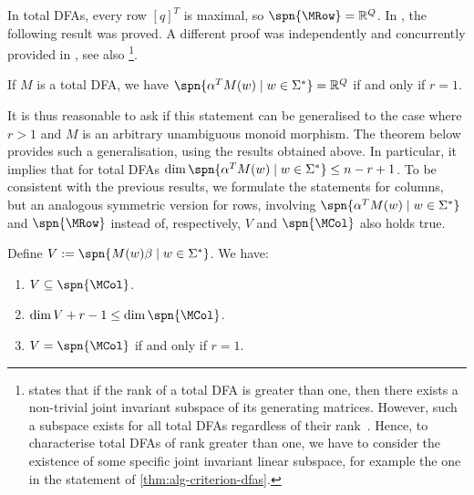 In total DFAs, every row $[q]^T$ is maximal, so $\spn{\MRow} = \mathbb{R}^Q$. In \cite[Criterion~1]{DBLP:journals/isci/BerlinkovS16}, the following result was proved. A different proof was independently and concurrently provided in \cite[\S8]{Voynov2015Compact}, see also \cite{Protasov2021}\footnote{ \cite[Theorem 2]{Protasov2021} states that if the rank of a total DFA is greater than one, then there exists a non-trivial joint invariant subspace of its generating matrices. However, such a subspace exists for all total DFAs regardless of their rank~\cite[Corollary 4]{Protasov2017}. 
Hence, to characterise total DFAs of rank greater than one, we have to consider the existence of some specific joint invariant linear subspace, for example the one in the statement of \autoref{thm:alg-criterion-dfas}.}.

\begin{thm}\label{thm:alg-criterion-dfas}
    If $M$ is a total DFA, we have 
    $\spn{\alpha^T M(w) \mid w \in \Sigma^*} = \mathbb{R}^Q$
    if and only if $r=1$.
\end{thm}

\noindent
It is thus reasonable to ask if this statement can be generalised to the case where $r > 1$ and $M$ is an arbitrary unambiguous monoid morphism. The theorem below provides such a generalisation, using the results obtained above. In particular, it implies that for total DFAs $\dim \spn{\alpha^T M(w) \mid w \in \Sigma^*} \le n - r + 1$. To be consistent with the previous results, we formulate the statements for columns, but an analogous symmetric version for rows, involving $\spn{\alpha^T M(w) \mid w \in \Sigma^*}$ and $\spn{\MRow}$ instead of, respectively, $V$ and $\spn{\MCol}$ also holds true. 

\begin{thm}\label{thm:algebraic}
Define $V := \spn{M(w) \beta \mid w \in \Sigma^*}$.
We have:
\begin{enumerate}
\item[(a)] $V \subseteq \spn{\MCol}$.
\item[(b)] $\dim V + r-1 \le \dim \spn{\MCol}$.
\item[(c)] $V = \spn{\MCol}$ if and only if $r=1$.
\end{enumerate}
\end{thm}

